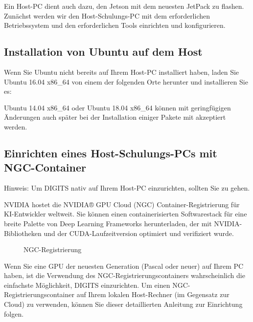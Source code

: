 Ein Host-PC dient auch dazu, den Jetson mit dem neuesten JetPack zu flashen. Zunächst werden wir den Host-Schulungs-PC mit dem erforderlichen Betriebssystem und den erforderlichen Tools einrichten und konfigurieren.


\subsection{Installation von Ubuntu auf dem Host}

Wenn Sie Ubuntu nicht bereits auf Ihrem Host-PC installiert haben, laden Sie Ubuntu 
16.04 x86\_64 von einem der folgenden Orte herunter und installieren Sie es:

\medskip



\medskip


Ubuntu 14.04 x86\_64 oder Ubuntu 18.04 x86\_64 können mit geringfügigen Änderungen auch später bei der Installation einiger Pakete mit  akzeptiert werden.


\subsection{Einrichten eines Host-Schulungs-PCs mit NGC-Container}

    Hinweis: Um DIGITS nativ auf Ihrem Host-PC einzurichten, sollten Sie zu  gehen.

\bigskip


NVIDIA hostet die NVIDIA® GPU Cloud (NGC) Container-Registrierung für KI-Entwickler weltweit. Sie können einen containerisierten Softwarestack für eine breite Palette von Deep Learning  Frameworks herunterladen, der mit NVIDIA-Bibliotheken und der CUDA-Laufzeitversion optimiert und verifiziert wurde.

\begin{figure}
  
  \caption{NGC-Registrierung}
\end{figure}


Wenn Sie eine GPU der neuesten Generation (Pascal oder neuer) auf Ihrem PC haben, ist die Verwendung des NGC-Registrierungscontainers wahrscheinlich die einfachste Möglichkeit, DIGITS einzurichten. Um einen NGC-Registrierungscontainer auf Ihrem lokalen Host-Rechner (im Gegensatz zur Cloud) zu verwenden, können Sie dieser detaillierten Anleitung zur Einrichtung folgen.


